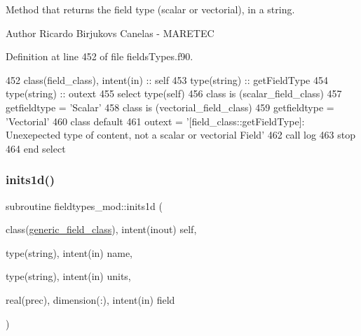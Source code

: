 Method that returns the field type (scalar or vectorial), in a string. 

\begin{DoxyAuthor}{Author}
Ricardo Birjukovs Canelas -\/ M\+A\+R\+E\+T\+EC 
\end{DoxyAuthor}


Definition at line 452 of file fields\+Types.\+f90.


\begin{DoxyCode}
452     \textcolor{keywordtype}{class}(field\_class), \textcolor{keywordtype}{intent(in)} :: self
453     \textcolor{keywordtype}{type}(string) :: getFieldType
454     \textcolor{keywordtype}{type}(string) :: outext
455     \textcolor{keywordflow}{select type}(self)
456 \textcolor{keywordflow}{    class is} (scalar\_field\_class)
457         getfieldtype = \textcolor{stringliteral}{'Scalar'}
458 \textcolor{keywordflow}{    class is} (vectorial\_field\_class)
459         getfieldtype = \textcolor{stringliteral}{'Vectorial'}
460 \textcolor{keywordflow}{        class default}
461         outext = \textcolor{stringliteral}{'[field\_class::getFieldType]: Unexepected type of content, not a scalar or vectorial
       Field'}
462         \textcolor{keyword}{call }log%
463         stop
464 \textcolor{keywordflow}{    end select}
\end{DoxyCode}
\mbox{\label{namespacefieldtypes__mod_a3f1571ad15733a3f2fff43e35f309416}} 
\subsubsection{\texorpdfstring{inits1d()}{inits1d()}}
{\footnotesize\ttfamily subroutine fieldtypes\+\_\+mod\+::inits1d (\begin{DoxyParamCaption}\item[{class(\mbox{\hyperlink{structfieldtypes__mod_1_1generic__field__class}{generic\+\_\+field\+\_\+class}}), intent(inout)}]{self,  }\item[{type(string), intent(in)}]{name,  }\item[{type(string), intent(in)}]{units,  }\item[{real(prec), dimension(\+:), intent(in)}]{field }\end{DoxyParamCaption})\hspace{0.3cm}{\ttfamily [private]}}



